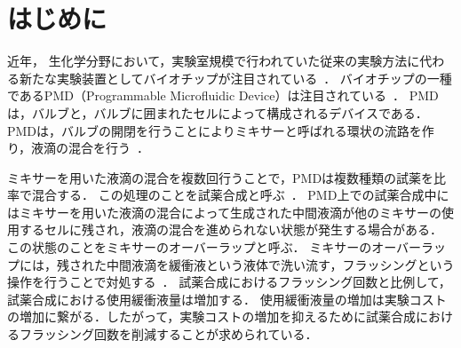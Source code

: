 \chapter{はじめに}
 \setlength{\parskip}{0cm} %
 \setlength{\itemsep}{0cm} %

    近年， 生化学分野において，実験室規模で行われていた従来の実験方法に代わる新たな実験装置としてバイオチップが注目されている~\cite{10.1146}\cite{urbanski2006}\cite{gubala2012point}．
    バイオチップの一種であるPMD（Programmable Microfluidic Device）は注目されている~\cite{1}\cite{9045675}\cite{10247720}．
    PMDは，バルブと，バルブに囲まれたセルによって構成されるデバイスである．
    PMDは，バルブの開閉を行うことによりミキサーと呼ばれる環状の流路を作り，液滴の混合を行う~\cite{FU2015343}\cite{7926964}．

    ミキサーを用いた液滴の混合を複数回行うことで，PMDは複数種類の試薬を比率で混合する．
    この処理のことを試薬合成と呼ぶ~\cite{2}\cite{poddar2021generic}．
    PMD上での試薬合成中にはミキサーを用いた液滴の混合によって生成された中間液滴が他のミキサーの使用するセルに残され，液滴の混合を進められない状態が発生する場合がある．
    この状態のことをミキサーのオーバーラップと呼ぶ．
    ミキサーのオーバーラップには，残された中間液滴を緩衝液という液体で洗い流す，フラッシングという操作を行うことで対処する~\cite{8715125}．
    試薬合成におけるフラッシング回数と比例して，試薬合成における使用緩衝液量は増加する．
    使用緩衝液量の増加は実験コストの増加に繋がる．したがって，実験コストの増加を抑えるために試薬合成におけるフラッシング回数を削減することが求められている．

